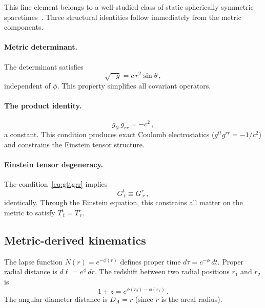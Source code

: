 \documentclass[aps,prd,twocolumn,superscriptaddress,nofootinbib,longbibliography]{revtex4-2}
\begin{document}
This line element belongs to a well-studied class of static
spherically symmetric spacetimes~\cite{Schwarzschild1916}.  Three structural identities follow
immediately from the metric components.

\paragraph{Metric determinant.}
The determinant satisfies
\begin{equation}\label{eq:detg}
  \sqrt{-g} = c\,r^2\sin\theta\,,
\end{equation}
independent of $\phi$.  This property simplifies all covariant
operators.

\paragraph{The product identity.}
\begin{equation}\label{eq:gttgrr}
  g_{tt}\,g_{rr} = -c^2\,,
\end{equation}
a constant.  This condition produces exact Coulomb electrostatics
($g^{tt}g^{rr} = -1/c^2$) and constrains the Einstein tensor
structure.

\paragraph{Einstein tensor degeneracy.}
The condition~\eqref{eq:gttgrr} implies
\begin{equation}\label{eq:gtgr}
  G^t_{\ t} \equiv G^r_{\ r}\,,
\end{equation}
identically.  Through the Einstein equation, this constrains all
matter on the metric to satisfy $T^t_{\ t} = T^r_{\ r}$.

\subsection{Metric-derived kinematics}

The lapse function $N(r) = e^{-\phi(r)}$ defines proper time
$d\tau = e^{-\phi}\,dt$.  Proper radial distance is
$d\ell = e^{\phi}\,dr$.  The redshift between two radial positions
$r_1$ and $r_2$ is
\begin{equation}\label{eq:redshift}
  1 + z = e^{\phi(r_2) - \phi(r_1)}\,.
\end{equation}
The angular diameter distance is $D_A = r$ (since $r$ is the areal
radius).
\end{document}
